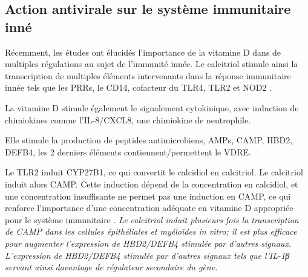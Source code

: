 \documentclass[
  a4paper,
  DIV=11,
  numbers=noendperiod,
  listof=totoc]{scrreprt}
\begin{document}
\hypertarget{action-antivirale-sur-le-systuxe8me-immunitaire-innuxe9}{%
\subsection{Action antivirale sur le système immunitaire
inné}\label{action-antivirale-sur-le-systuxe8me-immunitaire-innuxe9}}

Récemment, les études ont élucidés l'importance de la vitamine D dans de
multiples régulations au sujet de l'immunité innée. Le calcitriol
stimule ainsi la transcription de multiples éléments intervenants dans
la réponse immunitaire innée tels que les PRRs, le CD14, cofacteur du
TLR4, TLR2 et NOD2 \autocite{White.2022}.

La vitamine D stimule également le signalement cytokinique, avec
induction de chimiokines comme l'IL-8/CXCL8, une chimiokine de
neutrophile.

Elle stimule la production de peptides antimicrobiens, AMPs, CAMP, HBD2,
DEFB4, les 2 derniers éléments contiennent/permettent le VDRE.

Le TLR2 induit CYP27B1, ce qui convertit le calcidiol en calcitriol. Le
calcitriol induit alors CAMP. Cette induction dépend de la concentration
en calcidiol, et une concentration insuffisante ne permet pas une
induction en CAMP, ce qui renforce l'importance d'une concentration
adéquate en vitamine D appropriée pour le système immunitaire
\autocite{White.2022}. \emph{Le calcitriol induit plusieurs fois la
transcription de CAMP dans les cellules épithéliales et myéloïdes in
vitro; il est plus efficace pour augmenter l'expression de HBD2/DEFB4
stimulée par d'autres signaux. L'expression de HBD2/DEFB4 stimulée par
d'autres signaux tels que l'IL-1β servant ainsi davantage de régulateur
secondaire du gène.}
\end{document}
